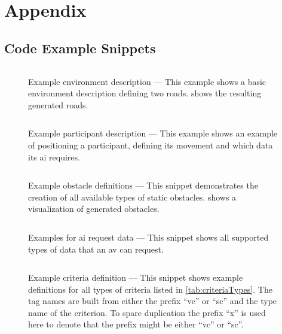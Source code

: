 \section{Appendix}
\FloatBarrier%
\subsection{Code Example Snippets}
\begin{figure}[h]
    \captionsetup{type=listing}
    \inputminted{xml}{code/exampleEnvironment.dbe.xml}
    \medskip
    \caption{%
        Example environment description --- This example shows a basic environment description defining two roads.
         shows the resulting generated roads.
    }\label{fig:exampleEnvironment}
\end{figure}
\begin{figure}[h]
    \captionsetup{type=listing}
    \inputminted{xml}{code/exampleMovement.dbc.xml}
    \medskip
    \caption{%
        Example participant description --- This example shows an example of positioning a participant, defining its movement and which data its \gls{ai} requires.
    }\label{fig:exampleParticipant}
\end{figure}
\begin{figure}[h]
    \captionsetup{type=listing}
    \inputminted{xml}{code/exampleObstacleDefinitions.xml}
    \medskip
    \caption{%
        Example obstacle definitions --- This snippet demonstrates the creation of all available types of static obstacles.
         shows a visualization of generated obstacles.
    }\label{fig:exampleObstacleDefinitions}
\end{figure}
\begin{figure}[h]
    \captionsetup{type=listing}
    \inputminted{xml}{code/exampleAIDataRequests.xml}
    \medskip
    \caption{%
        Examples for \gls{ai} request data --- This snippet shows all supported types of data that an \gls{av} can request.
    }\label{fig:exampleAIDataRequests}
\end{figure}
\begin{figure}[h]
    \captionsetup{type=listing}
    \inputminted{xml}{code/exampleCriteria.dbc.xml}
    \medskip
    \caption{%
        Example criteria definition --- This snippet shows example definitions for all types of criteria listed in \cref{tab:criteriaTypes}.
        The tag names are built from either the prefix \enquote{vc} or \enquote{sc} and the type name of the criterion.
        To spare duplication the prefix \enquote{x} is used here to denote that the prefix might be either \enquote{vc} or \enquote{sc}.
    }\label{fig:exampleCriteria}
\end{figure}

